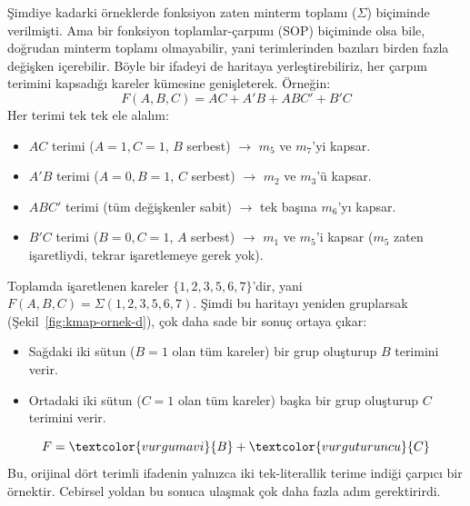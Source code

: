 \begin{ornek}
\label{orn:kmap-d}
Şimdiye kadarki örneklerde fonksiyon zaten minterm toplamı ($\Sigma$) biçiminde
verilmişti. Ama bir fonksiyon toplamlar-çarpımı (SOP) biçiminde olsa bile, doğrudan
minterm toplamı olmayabilir, yani terimlerinden bazıları birden fazla değişken
içerebilir. Böyle bir ifadeyi de haritaya yerleştirebiliriz, her çarpım terimini
kapsadığı kareler kümesine genişleterek. Örneğin:
\[
F(A,B,C) = AC + A'B + ABC' + B'C
\]
Her terimi tek tek ele alalım:
\begin{itemize}[nosep, leftmargin=*]
    \item $AC$ terimi ($A=1,C=1$, $B$ serbest) $\to$ $m_5$ ve $m_7$'yi kapsar.
    \item $A'B$ terimi ($A=0,B=1$, $C$ serbest) $\to$ $m_2$ ve $m_3$'ü kapsar.
    \item $ABC'$ terimi (tüm değişkenler sabit) $\to$ tek başına $m_6$'yı kapsar.
    \item $B'C$ terimi ($B=0,C=1$, $A$ serbest) $\to$ $m_1$ ve $m_5$'i kapsar ($m_5$
    zaten işaretliydi, tekrar işaretlemeye gerek yok).
\end{itemize}
Toplamda işaretlenen kareler $\{1,2,3,5,6,7\}$'dir, yani $F(A,B,C)=\Sigma(1,2,3,5,6,7)$.
Şimdi bu haritayı yeniden gruplarsak (Şekil~\ref{fig:kmap-ornek-d}), çok daha sade bir
sonuç ortaya çıkar:
\begin{itemize}[nosep, leftmargin=*]
    \item Sağdaki iki sütun ($B=1$ olan tüm kareler) bir grup oluşturup $B$ terimini verir.
    \item Ortadaki iki sütun ($C=1$ olan tüm kareler) başka bir grup oluşturup $C$
    terimini verir.
\end{itemize}
\[
F = \textcolor{vurgumavi}{B} + \textcolor{vurguturuncu}{C}
\]
Bu, orijinal dört terimli ifadenin yalnızca iki tek-literallik terime indiği çarpıcı bir
örnektir. Cebirsel yoldan bu sonuca ulaşmak çok daha fazla adım gerektirirdi.


\end{ornek}
